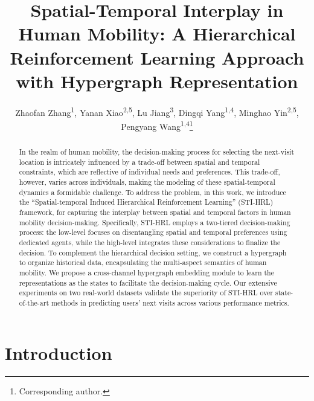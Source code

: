 \documentclass[letterpaper]{article} %
\title{Spatial-Temporal Interplay in Human Mobility: A Hierarchical Reinforcement Learning Approach with Hypergraph Representation}
\author{
    Zhaofan Zhang\textsuperscript{\rm 1}\equalcontrib,
    Yanan Xiao\textsuperscript{\rm 2,5}\equalcontrib,
    Lu Jiang\textsuperscript{\rm 3},
    Dingqi Yang\textsuperscript{\rm 1,4},
    Minghao Yin\textsuperscript{\rm 2,5},
    Pengyang Wang\textsuperscript{\rm 1,4}\thanks{Corresponding author.}
}
\begin{document}
\maketitle

\begin{abstract}
In the realm of human mobility, the decision-making process for selecting the next-visit location is intricately influenced by a trade-off between spatial and temporal constraints, which are reflective of individual needs and preferences.
This trade-off, however, varies across individuals, making the modeling of these spatial-temporal dynamics a formidable challenge.
To address the problem, in this work, we introduce the ``Spatial-temporal Induced Hierarchical Reinforcement Learning'' (STI-HRL) framework, for capturing the interplay between spatial and temporal factors in human mobility decision-making.
Specifically, STI-HRL employs a two-tiered decision-making process: the low-level focuses on disentangling spatial and temporal preferences using dedicated agents, while the high-level integrates these considerations to finalize the decision.
To complement the hierarchical decision setting, we construct a hypergraph to organize historical data, encapsulating the multi-aspect semantics of human mobility.
We propose a cross-channel hypergraph embedding module to learn the representations as the states to facilitate the decision-making cycle.
Our extensive experiments on two real-world datasets validate the superiority of STI-HRL over state-of-the-art methods in predicting users' next visits across various performance metrics.

\end{abstract}

\section{Introduction}
\end{document}
